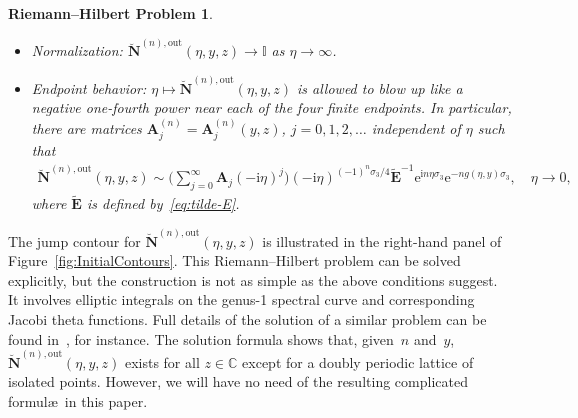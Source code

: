 \documentclass[11pt]{article}
\numberwithin{equation}{section}
\numberwithin{equation}{section}
\newtheorem{rhp}[Theorem]{Riemann--Hilbert Problem}
 { \theoremstyle{definition}
\newtheorem{Definition}[Theorem]{Definition}
\newtheorem{Note}[Theorem]{Note}
\newtheorem{Example}[Theorem]{Example}
\newtheorem{Remark}[Theorem]{Remark} }
\begin{document}
\begin{rhp}
\begin{itemize}
\begin{gather}
 \eta\in\Sigma_{0,1}, \nonumber \\
 \breve{\mathbf{N}}^{(n),\mathrm{out}}_+(\eta,y,z)=\breve{\mathbf{N}}^{(n),\mathrm{out}}_-(\eta,y,z)\mathrm{e}^{z(-\mathrm{i}\eta)^{-1/2}\sigma_3}\mathrm{e}^{-\mathrm{i} n\kappa(y)\sigma_3}\mathrm{e}^{-z(-\mathrm{i}\eta)^{-1/2}\sigma_3},\qquad\eta\in\Sigma_0^+, \nonumber \\
 \breve{\mathbf{N}}^{(n),\mathrm{out}}_+(\eta,y,z) \nonumber \\
 \qquad=\breve{\mathbf{N}}^{(n),\mathrm{out}}_-(\eta,y,z)\mathrm{e}^{z(-\mathrm{i}\eta)^{-1/2}\sigma_3}\begin{bmatrix}0 & \mathrm{i}\mathrm{e}^{\mathrm{i} n\psi(y)}\\\mathrm{i}\mathrm{e}^{-\mathrm{i} n\psi(y)} & 0\end{bmatrix}\mathrm{e}^{-z(-\mathrm{i}\eta)^{-1/2}\sigma_3},\qquad \eta\in\Sigma_{2,3}, \nonumber \\
 \breve{\mathbf{N}}^{(n),\mathrm{out}}_+(\eta,y,z)=\breve{\mathbf{N}}^{(n),\mathrm{out}}_-(\eta,y,z)
\mathrm{e}^{z(-\mathrm{i}\eta)_-^{-1/2}\sigma_3}\mathrm{e}^{-z(-\mathrm{i}\eta)_+^{-1/2}\sigma_3},\qquad\eta\in\Sigma_\infty^-.
\label{eq:outer-parametrix-unbounded-jump}
\end{gather}
\item[]Normalization: $\breve{\mathbf{N}}^{(n),\mathrm{out}}(\eta,y,z)\to\mathbb{I}$ as $\eta\to\infty$.
\item[]Endpoint behavior: $\eta\mapsto\breve{\mathbf{N}}^{(n),\mathrm{out}}(\eta,y,z)$ is allowed to blow up like a negative one-fourth power near each of the four finite endpoints. In particular, there are matrices $\mathbf{A}^{(n)}_j=\mathbf{A}^{(n)}_j(y,z)$, $j=0,1,2,\dots$ independent of $\eta$ such that
\begin{gather}
\breve{\mathbf{N}}^{(n),\mathrm{out}}(\eta,y,z)\sim \!\Bigg(\sum_{j=0}^\infty \mathbf{A}_j(-\mathrm{i}\eta)^j\Bigg)\!(-\mathrm{i}\eta)^{(-1)^n\sigma_3/4}\widetilde{\mathbf{E}}^{-1}\mathrm{e}^{\mathrm{i} n\eta\sigma_3}\mathrm{e}^{-ng(\eta,y)\sigma_3},\quad\eta\to 0,
\!\label{eq:parametrix-at-0}
\end{gather}
where $\tilde{\mathbf{E}}$ is defined by~\eqref{eq:tilde-E}.
\end{itemize}
\end{rhp}

The jump contour for $\breve{\mathbf{N}}^{(n),\mathrm{out}}(\eta,y,z)$ is illustrated in the right-hand panel of Figure~\ref{fig:InitialContours}. This Riemann--Hilbert problem can be solved explicitly, but the construction is not as simple as the above conditions suggest. It involves elliptic integrals on the genus-1 spectral curve and corresponding Jacobi theta functions. Full details of the solution of a similar problem can be found in~\cite[Section 4.4.2]{BothnerM20}, for instance. The solution formula shows that, given~$n$ and~$y$, $\breve{\mathbf{N}}^{(n),\mathrm{out}}(\eta,y,z)$ exists for all $z\in\mathbb{C}$ except for a doubly periodic lattice of isolated points. However, we will have no need of the resulting complicated formul\ae\ in this paper.
\end{document}
